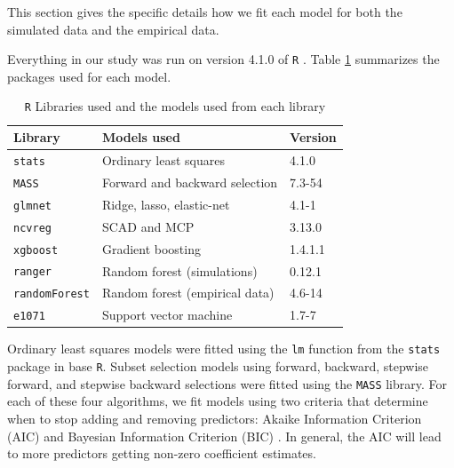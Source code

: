 \documentclass{article}
\begin{document}
	This section gives the specific details how we fit each model for both the simulated data and the empirical data.

	 Everything in our study was run on version 4.1.0 of \lstinline!R! \cite{r}. Table \ref{tab:model-libraries} summarizes the packages used for each model.
	 
	\begin{table}[h]
		\centering
		\caption{\lstinline!R! Libraries used and the models used from each library}
		\label{tab:model-libraries}
		\begin{tabular}{lll}\hline
			\textbf{Library}    	  & \textbf{Models used}                                 & \textbf{Version} \\ \hline
			\lstinline!stats! \cite{r}   	  & Ordinary least squares                               & 4.1.0            \\
			\lstinline!MASS! \cite{venables2002mass}   	  & Forward and backward selection                       & 7.3-54           \\
			\lstinline!glmnet! \cite{friedman2010regularization} 	  & Ridge, lasso, elastic-net                            & 4.1-1            \\
			\lstinline!ncvreg! \cite{breheny2011ncvreg}	      & SCAD and MCP                                         & 3.13.0           \\
			\lstinline!xgboost! \cite{chen2021xgboost}	  & Gradient boosting                                    & 1.4.1.1          \\
			\lstinline!ranger! \cite{wright2017ranger} 	  & Random forest (simulations)                          & 0.12.1           \\
			\lstinline!randomForest! \cite{liaw2002rf} & Random forest (empirical data)                       & 4.6-14           \\
			\lstinline!e1071! \cite{meyer2021e1071}  	  & Support vector machine                               & 1.7-7            \\\hline
		\end{tabular}
	\end{table}
	
	Ordinary least squares models were fitted using the \lstinline!lm! function from the \lstinline!stats! package in base \lstinline!R!. Subset selection models using forward, backward, stepwise forward, and stepwise backward selections were fitted using the \lstinline!MASS! library. For each of these four algorithms, we fit models using two criteria that determine when to stop adding and removing predictors: Akaike Information Criterion (AIC) and Bayesian Information Criterion (BIC) \cite{akaike1998information, schwarz1978estimating}. In general, the AIC will lead to more predictors getting non-zero coefficient estimates.
	
\end{document}
